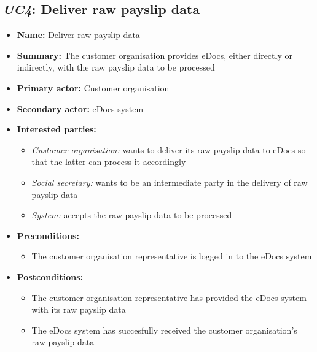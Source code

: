 \documentclass[a4paper,10pt]{article}
\begin{document}
\subsection{\emph{UC4}: Deliver raw payslip data}
\begin{itemize}
    \item \textbf{Name:} Deliver raw payslip data
    \item \textbf{Summary:} The customer organisation provides eDocs, either directly or indirectly, with the raw payslip data to be processed
    \item \textbf{Primary actor:} Customer organisation
    \item \textbf{Secondary actor:} eDocs system
    \item \textbf{Interested parties:} 
        \begin{itemize}
            \item \textit{Customer organisation:} wants to deliver its raw payslip data to eDocs so that the latter can process it accordingly
            \item \textit{Social secretary:} wants to be an intermediate party in the delivery of raw payslip data
            \item \textit{System:} accepts the raw payslip data to be processed
        \end{itemize}
    \item \textbf{Preconditions:}
        \begin{itemize}
            \item The customer organisation representative is logged in to the eDocs system
        \end{itemize}
    \item \textbf{Postconditions:}
        \begin{itemize}
            \item The customer organisation representative has provided the eDocs system with its raw payslip data
            \item The eDocs system has succesfully received the customer organisation's raw payslip data
        \end{itemize}
        

\end{itemize}
\end{document}
